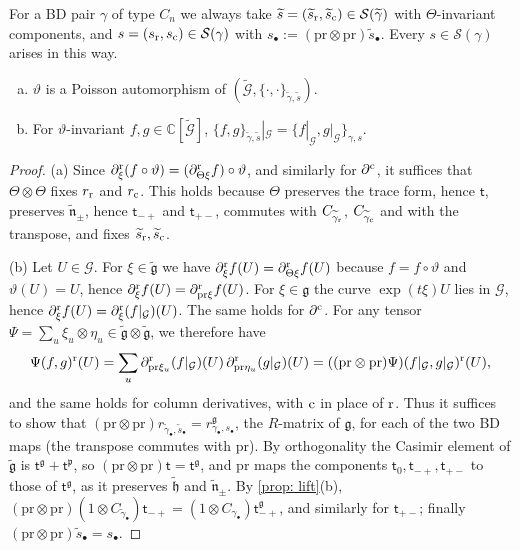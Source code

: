 \documentclass[a4paper]{amsart}
\numberwithin{equation}{section}
\theoremstyle{definition}
\theoremstyle{remark}
\newcommand{\bbC}{\mathbb{C}}
\newcommand{\mfh}{\mathfrak{h}}
\newcommand{\mfg}{\mathfrak{g}}
\newcommand{\mfn}{\mathfrak{n}}
\newcommand{\mfp}{\mathfrak{p}}
\newcommand{\mcG}{\mathcal{G}}
\newcommand{\mcS}{\mathcal{S}}
\newcommand{\tG}{\widetilde{\mcG}}
\newcommand{\tg}{\widetilde{\gamma}}
\newcommand{\vt}{\vartheta}
\newcommand{\Vt}{\Theta}
\newcommand{\rr}{{\rm r}}
\newcommand{\cc}{{\rm c}}
\newcommand{\pr}{\mathrm{pr}}
\newcommand{\Cas}{\mathsf t}
\begin{document}
For a BD pair $\gamma$ of type $C_n$ we always take $\widetilde{s}=(\widetilde{s}_{\rr},\widetilde{s}_{\cc})\in\mcS(\tg)$ with $\Vt$-invariant components, and $s=(s_{\rr},s_{\cc})\in\mcS(\gamma)$ with $s_\bullet:=(\pr\otimes\pr)\widetilde{s}_\bullet$. Every $s\in\mcS(\gamma)$ arises in this way.

\begin{proposition}
  \label{prop: restriction}
  \begin{enumerate}[(a)]
    \item $\vt$ is a Poisson automorphism of $(\tG,\{\cdot,\cdot\}_{\tg,\widetilde{s}})$.
    \item For $\vt$-invariant $f,g\in\bbC[\tG]$, $\{f,g\}_{\tg,\widetilde{s}}|_\mcG=\{f|_\mcG,g|_\mcG\}_{\gamma,s}$.
  \end{enumerate}
\end{proposition}
\begin{proof}
  (a) Since $\partial^\rr_\xi(f\circ\vt)=(\partial^\rr_{\Vt\xi}f)\circ\vt$, and similarly for $\partial^\cc$, it suffices that $\Vt\otimes\Vt$ fixes $r_\rr$ and $r_\cc$.
  This holds because $\Vt$ preserves the trace form, hence $\Cas$, preserves $\widetilde{\mfn}_\pm$, hence $\Cas_{-+}$ and $\Cas_{+-}$, commutes with $C_{\tg_{\rr}}$, $C_{\tg_{\cc}}$ and with the transpose, and fixes $\widetilde{s}_{\rr},\widetilde{s}_{\cc}$.

  (b) Let $U\in\mcG$.
  For $\xi\in\widetilde{\mfg}$ we have $\partial^\rr_\xi f(U)=\partial^\rr_{\Vt\xi}f(U)$ because $f=f\circ\vt$ and $\vt(U)=U$, hence $\partial^\rr_\xi f(U)=\partial^\rr_{\pr\xi}f(U)$.
  For $\xi\in\mfg$ the curve $\exp(t\xi)U$ lies in $\mcG$, hence $\partial^\rr_\xi f(U)=\partial^\rr_\xi(f|_\mcG)(U)$.
  The same holds for $\partial^\cc$.
  For any tensor $\Psi=\sum_u\xi_u\otimes\eta_u\in\widetilde{\mfg}\otimes\widetilde{\mfg}$, we therefore have
  \[
    \Psi(f,g)^\rr(U)=\sum_u\partial^\rr_{\pr\xi_u}(f|_\mcG)(U)\,\partial^\rr_{\pr\eta_u}(g|_\mcG)(U)=((\pr\otimes\pr)\Psi)(f|_\mcG,g|_\mcG)^\rr(U),
  \]
  and the same holds for column derivatives, with $\cc$ in place of $\rr$.
  Thus it suffices to show that $(\pr\otimes\pr)r_{\tg_\bullet,\widetilde{s}_\bullet}=r^\mfg_{\gamma_\bullet,s_\bullet}$, the $R$-matrix of $\mfg$, for each of the two BD maps (the transpose commutes with $\pr$).
  By orthogonality the Casimir element of $\widetilde{\mfg}$ is $\Cas^\mfg+\Cas^\mfp$, so $(\pr\otimes\pr)\Cas=\Cas^\mfg$, and $\pr$ maps the components $\Cas_0,\Cas_{-+},\Cas_{+-}$ to those of $\Cas^\mfg$, as it preserves $\widetilde{\mfh}$ and $\widetilde{\mfn}_\pm$.
  By \cref{prop: lift}(b), $(\pr\otimes\pr)(1\otimes C_{\tg_\bullet})\Cas_{-+}=(1\otimes C_{\gamma_\bullet})\Cas^\mfg_{-+}$, and similarly for $\Cas_{+-}$; finally $(\pr\otimes\pr)\widetilde{s}_\bullet=s_\bullet$.
\end{proof}
\end{document}
